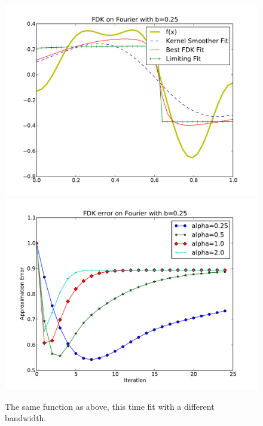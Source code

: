 \begin{figure}[!htb]
    \includegraphics[width=\linewidth]{figs/chap4/bump25.pdf}
  \endminipage\hfill
    \includegraphics[width=\linewidth]{figs/chap4/bump25err.pdf}
  \endminipage
\caption[Fitting an order 5 Fourier function with $b = .25$]
{The same function as above, this time fit with a different bandwidth.}
\end{figure}

